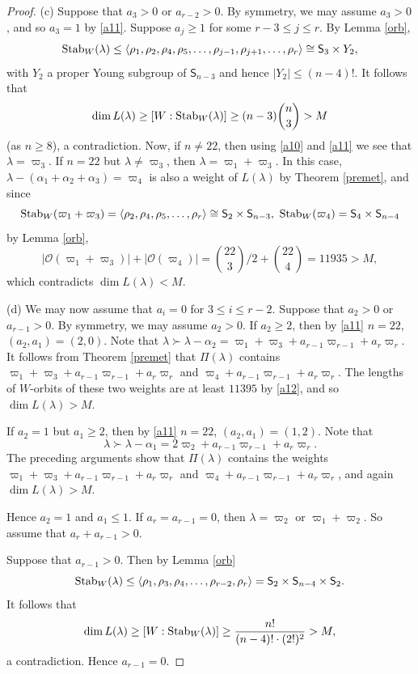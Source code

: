\documentclass[11pt]{amsart}
\theoremstyle{plain}
\theoremstyle{definition}
\numberwithin{thm}{section}
\numberwithin{equation}{thm}
\newcommand{\al}{\alpha}
\newcommand{\om}{\varpi}
\newcommand{\Stab}{{\rm Stab}}
\newcommand{\sO}{{\mathcal O}}
\newcommand{\0}{\emptyset}
\newcommand{\SBS}{\mathsf{S}}
\newcommand{\lam}{\lambda}
\begin{document}
\begin{proof}
\smallskip
(c) Suppose that $a_3 > 0$ or $a_{r-2} > 0$. By symmetry, we may assume $a_3 > 0$, and so $a_3=1$ by \eqref{a11}. 
Suppose $a_j \geq 1$ for some $r-3 \leq j \leq r$. By Lemma \ref{orb}, 
\begin{equation}\label{a11b}
  \Stab_W(\lam) \leq \langle \rho_1,\rho_2,\rho_4, \rho_5, \ldots,\rho_{j-1},\rho_{j+1}, \ldots,\rho_r \rangle 
   \cong \SBS_3 \times Y_2,
\end{equation}   
with $Y_2$ a proper Young subgroup of $\SBS_{n-3}$ and hence $|Y_2| \leq (n-4)!$. It follows that 
$$\dim L(\lam) \geq [W:\Stab_W(\lam)] \geq (n-3)\binom{n}{3} > M$$ 
(as $n \geq 8$), a contradiction. Now, if $n \neq 22$, then using \eqref{a10} and \eqref{a11} we see that $\lam=\om_3$.
If $n = 22$ but $\lam \neq \om_3$, then $\lam = \om_1+\om_3$. In this case, $\lam-(\al_1+\al_2+\al_3) = \om_4$ is 
also a weight of $L(\lam)$ by Theorem \ref{premet}, and since 
$$\Stab_W(\om_1+\om_3) = \langle \rho_2,\rho_4, \rho_5, \ldots,\rho_r \rangle 
   \cong \SBS_2 \times \SBS_{n-3},~\Stab_W(\om_4) = \SBS_4 \times \SBS_{n-4}$$
by Lemma \ref{orb}, %
\begin{equation}\label{a12}
   |\sO(\om_1+\om_3)|+|\sO(\om_4)| = \binom{22}{3}/2+\binom{22}{4} = 11935 > M,
\end{equation}
which contradicts $\dim L(\lam) < M$.

\smallskip
(d) We may now assume that $a_i=0$ for $3 \leq i \leq r-2$. Suppose that $a_2 > 0$ or $a_{r-1} > 0$. By symmetry, we may assume 
$a_2 > 0$. If $a_2 \geq 2$, then by \eqref{a11} $n=22$, $(a_2,a_1)= (2,0)$. Note that 
$\lam \succ \lam-\al_2 = \om_1+\om_3 +a_{r-1}\om_{r-1}+a_r\om_r$. It follows from Theorem \ref{premet} 
that $\Pi(\lam)$ contains $\om_1+\om_3 +a_{r-1}\om_{r-1}+a_r\om_r$ and $\om_4+a_{r-1}\om_{r-1}+a_r\om_r$. The lengths of
$W$-orbits of these two weights are at least $11395$ by \eqref{a12}, and so $\dim L(\lam) > M$.

If $a_2=1$ but $a_1 \geq 2$, then by \eqref{a11} $n=22$, $(a_2,a_1)= (1,2)$. Note that 
$$\lam \succ \lam-\al_1 = 2\om_2+a_{r-1}\om_{r-1}+a_r\om_r.$$ 
The preceding arguments show that  $\Pi(\lam)$ contains the weights
$\om_1+\om_3 +a_{r-1}\om_{r-1}+a_r\om_r$ and $\om_4+a_{r-1}\om_{r-1}+a_r\om_r$, and again $\dim L(\lam) > M$.

Hence $a_2=1$ and $a_1 \leq 1$. If $a_r=a_{r-1}=0$, then $\lam = \om_2$ or $\om_1+\om_2$.
So assume that $a_r+a_{r-1} > 0$.

Suppose that $a_{r-1} > 0$. Then by Lemma \ref{orb} %
\begin{equation}\label{a13}
\Stab_W(\lam) \leq \langle \rho_1,\rho_3,\rho_4, \ldots,\rho_{r-2},\rho_r \rangle 
   = \SBS_2 \times \SBS_{n-4} \times \SBS_2.
\end{equation}   
It follows that 
$$\dim L(\lam) \geq [W:\Stab_W(\lam)] \geq \frac{n!}{(n-4)! \cdot (2!)^2} > M,$$ 
a contradiction. Hence $a_{r-1}=0$. 


\end{proof}
\end{document}
